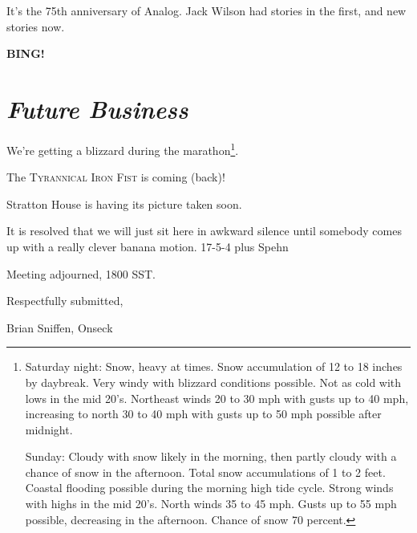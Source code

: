 \documentclass[10pt]{article}
\newcommand{\bing}{{\bf BING!} }
\newcommand{\goto}[1]{\bing \vskip 12pt \section*{{\em{#1}}}}
\newcommand{\ps}{ plus Spehn\xspace}
\begin{document}
It's the 75th anniversary of Analog.  Jack Wilson had stories in the
first, and new stories now.

\goto{Future Business}
We're getting a blizzard during the marathon\footnote{Saturday night: Snow, heavy at times. Snow accumulation of 12 to 18
       inches by daybreak. Very windy with blizzard conditions possible.
       Not as cold with lows in the mid 20's. Northeast winds 20 to 30 mph
       with gusts up to 40 mph, increasing to north 30 to 40 mph with gusts
       up to 50 mph possible after midnight.

          Sunday: Cloudy with snow likely in the morning, then partly
       cloudy with a chance of snow in the afternoon. Total snow
       accumulations of 1 to 2 feet. Coastal flooding possible during the
       morning high tide cycle. Strong winds with highs in the mid 20's.
       North winds 35 to 45 mph. Gusts up to 55 mph possible, decreasing in the
       afternoon. Chance of snow 70 percent.}.

The \textsc{Tyrannical Iron Fist} is coming (back)!

Stratton House is having its picture taken soon.

It is resolved that we will just sit here in awkward silence until
somebody comes up with a really clever banana motion. 17-5-4\ps

\vspace{12pt}

\noindent
Meeting adjourned, 1800 SST.

\vspace{18pt}

\centerline{Respectfully submitted,}
\centerline{Brian Sniffen, Onseck}
\end{document}
